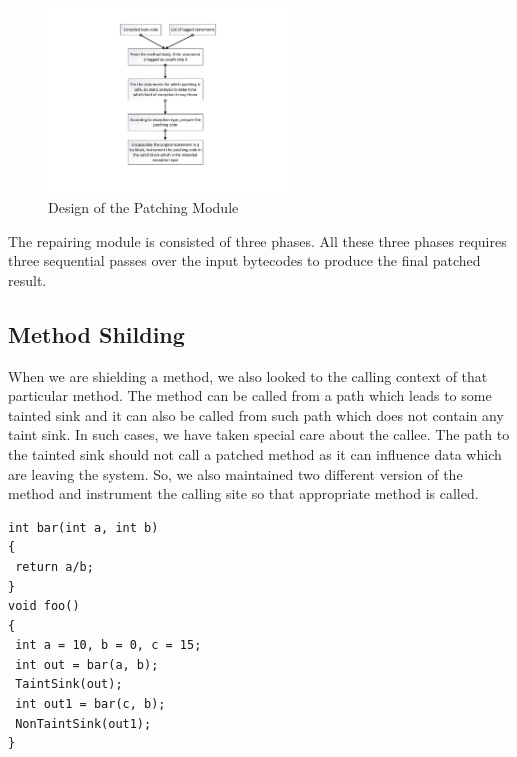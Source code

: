 \begin{figure}
\centering
  \includegraphics[width= 2.5in]{images/PatchModule.pdf}
  \caption{Design of the Patching Module}
  \label{fig:PatchModule}
\end{figure}

The repairing module is consisted of three phases. All these three phases
requires three sequential passes over the input bytecodes to produce the final
patched result.


\subsection{Method Shilding}
\label{MethodShilding}


When we are shielding a method, we also looked to the calling context of that
particular method. The method can be called from a path which leads to some
tainted sink and it can also be called from such path which does not contain
any taint sink. In such cases, we have taken special care about the callee. The
path to the tainted sink should not call a patched method as it can influence
data which are leaving the system. So, we also maintained two different version of
the method and instrument the calling site so that appropriate method is called.


\onehalfspacing
\lstset{language=Java, caption = Same method calling in different scenario,
label=callingContext}

\begin{lstlisting}
int bar(int a, int b)
{
 return a/b;
}
void foo()
{
 int a = 10, b = 0, c = 15;
 int out = bar(a, b);
 TaintSink(out);
 int out1 = bar(c, b);
 NonTaintSink(out1);
}
\end{lstlisting}

\onehalfspacing

\lstset{language=Java, caption = Mehod name modification for different calling
context, label=callingContextPatch}

